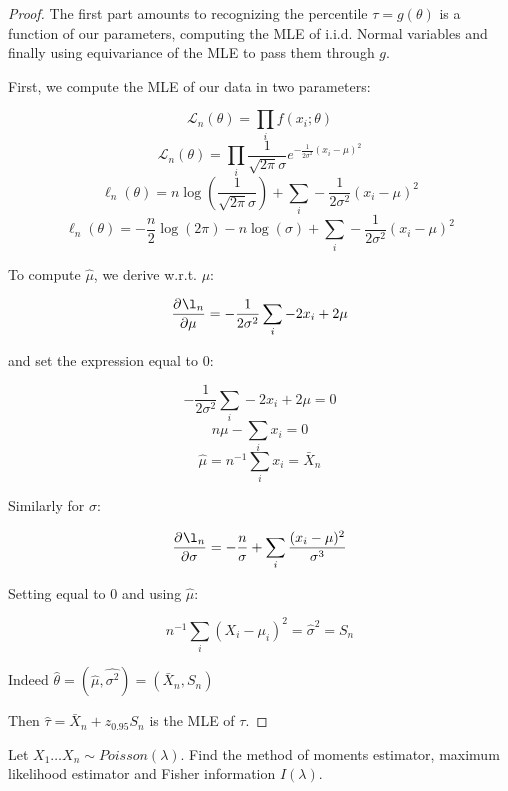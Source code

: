 \documentclass[10pt]{article}
\begin{document}
\begin{proof}
    The first part amounts to recognizing the percentile $\tau = g(\theta)$ is
    a function of our parameters, computing the MLE of i.i.d. Normal variables
    and finally using equivariance of the MLE to pass them through $g$.

    First, we compute the MLE of our data in two parameters:

    \[\mathcal{L}_n(\theta) = \prod_i f(x_i; \theta)\]
    \[\mathcal{L}_n(\theta) = \prod_i \frac{1}{\sqrt{2\pi}\sigma}e^{-\frac{1}{2\sigma^2}(x_i-\mu)^2} \]
    \[\ell_n(\theta) = n\log(\frac{1}{\sqrt{2\pi}\sigma}) + \sum_i -\frac{1}{2\sigma^2}(x_i-\mu)^2 \]
    \[\ell_n(\theta) = -\frac{n}{2}\log(2\pi) - n\log(\sigma) + \sum_i -\frac{1}{2\sigma^2}(x_i-\mu)^2 \]

    To compute $\hat{\mu}$, we derive w.r.t. $\mu$:

    \[\pdv{\l_n}{\mu} =  -\frac{1}{2\sigma^2} \sum_i -2x_i + 2\mu \]

    and set the expression equal to 0:

    \[-\frac{1}{2\sigma^2} \sum_i -2x_i + 2\mu  = 0\]
    \[n\mu - \sum_i x_i  = 0\]
    \[\hat{\mu} = n^{-1}\sum_i x_i = \bar{X}_n\]

    Similarly for $\hat{\sigma}$:

    \[\pdv{\l_n}{\sigma} =  -\frac{n}{\sigma} + \sum_i \frac{(x_i - \mu)^2}{\sigma^3} \]

    Setting equal to 0 and using $\hat{\mu}$:

    \[n^{-1} \sum_i (X_i - \mu_i)^2 = \hat{\sigma}^2 = S_n\]

    Indeed $\hat{\theta} = (\hat{\mu}, \hat{\sigma^2}) = (\bar{X}_n, S_n)$

    Then $\hat{\tau} = \bar{X}_n + z_{0.95}S_n$ is the MLE of $\tau$.
\end{proof}

\setcounter{exercise}{4}
\begin{exercise}
    Let $X_1 \dots X_n \sim Poisson(\lambda)$. Find the method of moments
    estimator, maximum likelihood estimator and Fisher information
    $I(\lambda)$.
\end{exercise}
\end{document}
